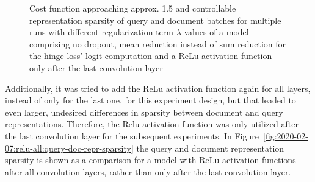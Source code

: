\begin{figure}[htbp]
\centering
\begin{subfigure}[b]{0.96\textwidth}
    \centering
    \label{fig:2020-02-07:relu-only-last:cost-fn}
\end{subfigure}
\begin{subfigure}[b]{0.45\textwidth}
    \centering
    \label{fig:2020-02-07:relu-only-last:sparsity-query-repr}
\end{subfigure}
\hspace{0.042\textwidth}
\begin{subfigure}[b]{0.45\textwidth}
    \centering
    \label{fig:2020-02-07:relu-only-last:sparsity-doc-repr}
\end{subfigure}
\caption[Costs function and controllable sparsity of multiple runs with different values of regularization term $\lambda$ of a model comprising sum reduction for hinge loss' logits computation, no dropout and ReLu only after the last layer]{Cost function approaching approx. 1.5 and controllable representation sparsity of query and document batches for multiple runs with different regularization term $\lambda$ values of a model comprising no dropout, mean reduction instead of sum reduction for the hinge loss' logit computation and a ReLu activation function only after the last convolution layer}
\label{fig:2020-02-07:relu-only-last:cost-fn-query-doc-repr-sparsity} %
\end{figure}

Additionally, it was tried to add the ReLu activation function again for all layers, instead of 
    only for the last one, for this experiment design, but that leaded to even larger, undesired 
    differences in sparsity between document and query representations.
Therefore, the Relu activation function was only utilized after the last convolution layer for the
    subsequent experiments.
In Figure~\ref{fig:2020-02-07:relu-all:query-doc-repr-sparsity} the query and document representation
    sparsity is shown as a comparison for a model with ReLu activation functions 
    after all convolution layers, rather than only after the last convolution layer.


